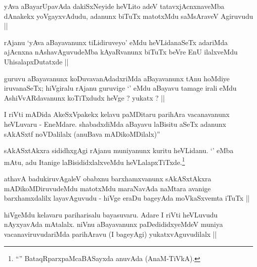 \begin{artha}
yAva aBayarUpavAda dakiSxNeyide heVLito adeV tatavxjAcnxnaveMba dAnakekx yoVgayxvAdudu, adanunx biTuTx matotxMdu saMsAraveV Agiruvudu ||
\end{artha}


\begin{artha}
rAjanu `yAva aBayavanunx tiLidiruveyo' eMdu heVLidanaSeTx adariMda ajAcnxna nAshavAguvudeMba kAyaRvanunx biTuTx beVre EnU ilalxveMdu UhisalapxDutatxde ||
\end{artha}


\begin{artha}
guruvu aBayavanunx koDuvavanAdadxriMda aBayavanunx tAnu hoMdiye iruvanaSeTx; hiVgiralu rAjanu guruvige `\stext' eMdu aBayavu tamage irali eMdu AshiVvARdavanunx koTiTxdudx heVge ? yukatx ? ||
\end{artha}


\begin{artha}
I riVti mADida AkeSxVpakekx kelavu paMDitaru parihAra vacanavanunx heVLuvaru - EneMdare. shabadxdiMda aBayavu laBisitu aSeTx adanunx sAkASxtf noVDalilalx (anuBava mADikoMDilalx)''
\end{artha}

\begin{artha}
sAkASxtAkxra sididhxgAgi rAjanu muniyanunx kuritu heVLidanu. `\stext' eMba mAtu, adu Itanige laBisididxlalxveMdu heVLalapxTiTxde.\footnote{``\stext'' BataqRparxpaMcaBASayxda anuvAda (AnaM-TiVkA).}
\end{artha}


\begin{artha}
athavA badukiruvAgaleV obabxnu barxhamxvanunx sAkASxtAkxra mADikoMDiruvudeMdu matotxMdu maraNavAda naMtara avanige barxhamxdalilx layavAguvudu - hiVge eraDu bageyAda moVkaSxvemta iTuTx ||
\end{artha}

\begin{artha}
hiVgeMdu kelavaru pariharisalu bayasuvaru. Adare I riVti heVLuvudu nAyxyavAda mAtalalx. niVnu aBayavanunx paDedididxyeMdeV muniya vacanaviruvudariMda parihAravu (I bageyAgi) yukatxvAguvudilalx ||
\end{artha}

